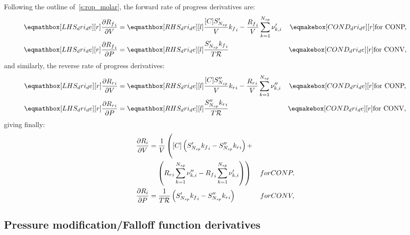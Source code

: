 \documentclass[12pt]{article}
\newcommand{\ns}{N_{sp}}
\newcommand{\conp}{CONP}
\newcommand{\conv}{CONV}
\newcommand{\dconp}{\ifmmode\text{for \conp,}\else for \conp,\fi}
\newcommand{\dconv}{\ifmmode\text{for \conv,}\else for \conv,\fi}
\newcommand{\Ru}{\mathcal{R}}
\begin{document}
Following the outline of~\cref{s:rop_molar}, the forward rate of progress derivatives are:
\begin{subequations}
 \begin{align}
  \lhs{dri_de}{\frac{\partial {R_f}_{i} }{\partial V }} &= \rhs{dri_de}{\frac{[C] S^{\prime}_{\ns}}{V} {k_f}_{i} - \frac{{R_f}_{i}}{V} \sum_{k=1}^{\ns} \nu^{\prime}_{k,i}}&\cond{dri_de}{\dconp}\\
  \lhs{dri_de}{\frac{\partial {R_f}_{i} }{\partial P }} &= \rhs{dri_de}{\frac{S^{\prime}_{\ns} {k_f}_{i}}{T \Ru}}&\cond{dri_de}{\dconv}
 \end{align}
\end{subequations}
and similarly, the reverse rate of progress derivatives:
\begin{subequations}
 \begin{align}
  \lhs{dri_de}{\frac{\partial {R_r}_{i} }{\partial V }} &= \rhs{dri_de}{\frac{[C] S^{\prime\prime}_{\ns}}{V} {k_r}_{i} - \frac{{R_r}_{i}}{V} \sum_{k=1}^{\ns} \nu^{\prime\prime}_{k,i}}&\cond{dri_de}{\dconp}\\
  \lhs{dri_de}{\frac{\partial {R_r}_{i} }{\partial P }} &= \rhs{dri_de}{\frac{S^{\prime\prime}_{\ns} {k_r}_{i}}{T \Ru}}&\cond{dri_de}{\dconv}
 \end{align}
\end{subequations}
giving finally:
\begin{subequations}
 \label{e:dropi_de}
 \begin{align}
  \frac{\partial {R}_{i} }{\partial V } &= \frac{1}{V}\left(\vphantom{{R_r}_{i} \sum_{k=1}^{\ns} \nu^{\prime\prime}_{k,i}} [C]\left(S^{\prime}_{\ns} {k_f}_{i} - S^{\prime\prime}_{\ns} {k_r}_{i}\right) + \right.& \nonumber\\
  &\left. \quad\left({R_r}_{i} \sum_{k=1}^{\ns} \nu^{\prime\prime}_{k,i} - {R_f}_{i} \sum_{k=1}^{\ns} \nu^{\prime}_{k,i}\right) \right)&\dconp\\
  \frac{\partial {R}_{i} }{\partial P } &= \frac{1}{T \Ru} \left(S^{\prime}_{\ns} {k_f}_{i} - S^{\prime\prime}_{\ns} {k_r}_{i}\right)&\dconv
 \end{align}
\end{subequations}

\subsection{Pressure modification\slash Falloff function derivatives}
\end{document}
